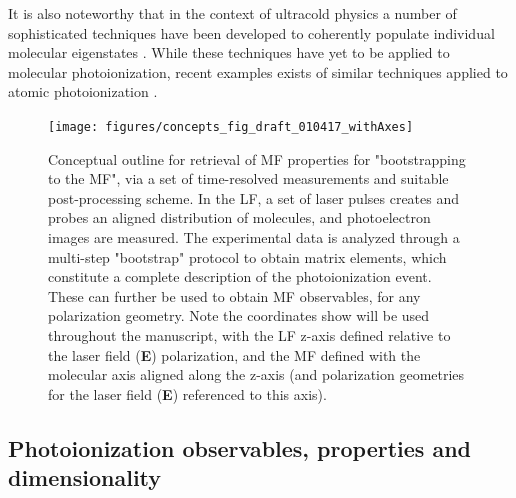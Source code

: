 \documentclass[10pt]{article}
\begin{document}
It is also noteworthy that in the context of ultracold physics a number of sophisticated techniques have been developed to coherently populate individual molecular eigenstates \cite{mitra2022QuantumControlMolecules}. While these techniques have yet to be applied to molecular photoionization, recent examples exists of similar techniques applied to atomic photoionization \cite{desilva2021CircularDichroismAtomic}.


\begin{figure}[]
\begin{center}
\texttt{[image: figures/concepts\_fig\_draft\_010417\_withAxes]}
\caption{Conceptual outline for retrieval of MF properties for "bootstrapping to the MF", via a set of time-resolved measurements and suitable post-processing scheme. In the LF, a set of laser pulses creates and probes an aligned distribution of molecules, and photoelectron images are measured. The experimental data is analyzed through a multi-step "bootstrap" protocol to obtain matrix elements, which constitute a complete description of the photoionization event. These can further be used to obtain MF observables, for any polarization geometry. Note the coordinates show will be used throughout the manuscript, with the LF z-axis defined relative to the laser field (\textbf{E}) polarization, and the MF defined with the molecular axis aligned along the z-axis (and polarization geometries for the laser field (\textbf{E}) referenced to this axis).\label{781808}}
\end{center}
\end{figure}


\subsection{Photoionization observables, properties and dimensionality\label{sec:Photo-into}}
\end{document}
